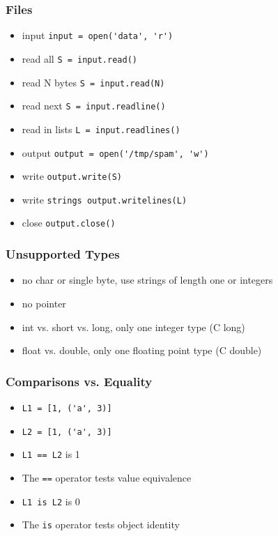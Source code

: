 \begin{frame}[fragile]\frametitle{Files}
  \begin{itemize}
  \item input \lstinline{input = open('data', 'r')}
  \item read all \lstinline{S = input.read()}
  \item read N bytes \lstinline{S = input.read(N)}
  \item read next \lstinline{S = input.readline()}
  \item read in lists \lstinline{L = input.readlines()}
  \item output \lstinline{output = open('/tmp/spam', 'w')}
  \item write \lstinline{output.write(S)}
  \item write \lstinline{strings output.writelines(L)}
  \item close \lstinline{output.close()}
  \end{itemize}
\end{frame}


\begin{frame}[fragile]\frametitle{Unsupported Types}
  \begin{itemize}
  \item no char or single byte, use strings of length one or integers
  \item no pointer
  \item int vs. short vs. long, only one integer type (C long)
  \item float vs. double, only one floating point type (C double)
  \end{itemize}
\end{frame}

\begin{frame}[fragile]\frametitle{Comparisons vs. Equality}
  \begin{itemize}
  \item \lstinline{L1 = [1, ('a', 3)]}
  \item \lstinline{L2 = [1, ('a', 3)]}
  \item \lstinline{L1 == L2} is 1
    \item The \lstinline{==} operator tests value equivalence
    \item \lstinline{L1 is L2} is 0

  \item The \lstinline{is} operator tests object identity
  \end{itemize}
\end{frame}

